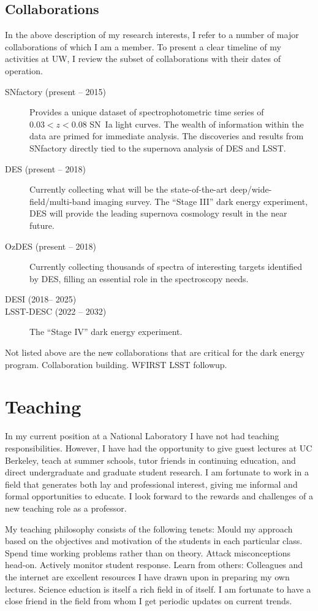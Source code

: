 \documentclass{article}
\begin{document}
\subsection{Collaborations}
In the above description of my research interests, I refer to a number of major collaborations of which I am a member.  To
present a clear timeline of my  activities at UW, I review the subset of collaborations with their dates of operation.
\begin{description}
\item[SNfactory (present -- 2015)]  Provides a unique dataset of
spectrophotometric time series of $0.03<z<0.08$ SN~Ia light curves.  The wealth of information
within the data are primed for immediate analysis. The discoveries and results from SNfactory directly tied to the supernova
analysis of DES and LSST.
\item[DES (present -- 2018)] Currently collecting what will be the state-of-the-art deep/wide-field/multi-band
imaging survey.   The ``Stage III'' dark energy experiment, DES will provide the leading supernova
cosmology result in the near future.
\item[OzDES (present -- 2018)] Currently collecting thousands of spectra of interesting targets identified by DES,
filling an essential role in the spectroscopy needs.
\item[DESI (2018-- 2025)]
\item[LSST-DESC (2022 -- 2032)]  The ``Stage IV'' dark energy experiment.
\end{description}

Not listed above are the new collaborations that are critical for the dark energy program.
Collaboration building. WFIRST LSST followup.

\section{Teaching}
In my current position at a National Laboratory I have not had teaching responsibilities.  However,
I have had the opportunity to give guest lectures at UC Berkeley, teach at summer schools, tutor friends
in continuing education, and direct undergraduate and graduate student research.  I am fortunate to work
in a field that generates both lay and professional interest, giving me informal and formal opportunities to
educate.  I look forward to the rewards and challenges of a new teaching role as a professor. 

My teaching philosophy consists of the following tenets:
Mould my approach based on the objectives and motivation of the students in each particular class.
Spend time working problems rather than on theory.
Attack misconceptions head-on.
Actively monitor student response.
Learn from others: Colleagues and the internet are excellent resources I have drawn upon in preparing
my own lectures.  Science eduction is itself a rich field in of itself.  I am fortunate to have a close friend in the field
from whom I get periodic updates on current trends.
\end{document}
